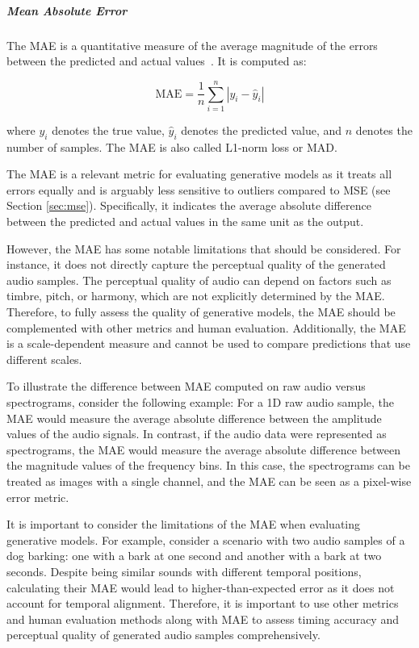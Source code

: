 \subparagraph{Mean Absolute Error} \label{sec:mae}

The \Acf{MAE} is a quantitative measure of the average magnitude of the errors between the predicted and actual values~\cite{willmott_advantages_2005}. It is computed as:

\begin{equation}
	\text{MAE} = \frac{1}{n} \sum_{i=1}^n |y_i - \hat{y}_i| 
\end{equation}

where $y_i$ denotes the true value, $\hat{y}_i$ denotes the predicted value, and $n$ denotes the number of samples. The \ac{MAE} is also called L1-norm loss or \acf{MAD}.  

The \Ac{MAE} is a relevant metric for evaluating generative models as it treats all errors equally and is arguably less sensitive to outliers compared to \ac{MSE} (see Section \ref{sec:mse}). Specifically, it indicates the average absolute difference between the predicted and actual values in the same unit as the output.

However, the \ac{MAE} has some notable limitations that should be considered. For instance, it does not directly capture the perceptual quality of the generated audio samples. The perceptual quality of audio can depend on factors such as timbre, pitch, or harmony, which are not explicitly determined by the \ac{MAE}. Therefore, to fully assess the quality of generative models, the \ac{MAE} should be complemented with other metrics and human evaluation. Additionally, the \ac{MAE} is a scale-dependent measure and cannot be used to compare predictions that use different scales.

To illustrate the difference between \ac{MAE} computed on raw audio versus spectrograms, consider the following example: For a 1D raw audio sample, the \ac{MAE} would measure the average absolute difference between the amplitude values of the audio signals. In contrast, if the audio data were represented as spectrograms, the \ac{MAE} would measure the average absolute difference between the magnitude values of the frequency bins. In this case, the spectrograms can be treated as images with a single channel, and the \ac{MAE} can be seen as a pixel-wise error metric.  

It is important to consider the limitations of the \ac{MAE} when evaluating generative models. For example, consider a scenario with two audio samples of a dog barking: one with a bark at one second and another with a bark at two seconds. Despite being similar sounds with different temporal positions, calculating their \ac{MAE} would lead to higher-than-expected error as it does not account for temporal alignment. Therefore, it is important to use other metrics and human evaluation methods along with \ac{MAE} to assess timing accuracy and perceptual quality of generated audio samples comprehensively.

